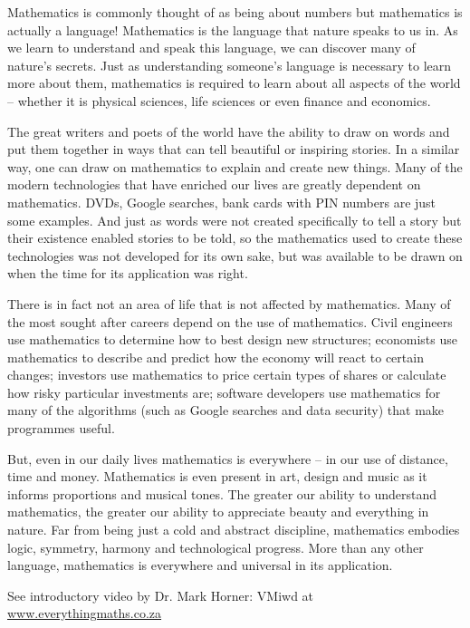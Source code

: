{ \Large
Mathematics is commonly thought of as being about numbers but mathematics is actually a language! Mathematics is the language that nature speaks to us in. As we learn to understand and speak this language, we can discover many of nature’s secrets. Just as understanding someone’s language is necessary to learn more about them, mathematics is required to learn about all aspects of the world -- whether it is physical sciences, life sciences or even finance and economics.\par


The great writers and poets of the world have the ability to draw on words and put them together in
ways that can tell beautiful or inspiring stories. In a similar way, one can draw on mathematics to
explain and create new things. Many of the modern technologies that have enriched our lives are
greatly dependent on mathematics. DVDs, Google searches, bank cards with PIN numbers are just
some examples. And just as words were not created specifically to tell a story but their existence enabled
stories to be told, so the mathematics used to create these technologies was not developed for its own sake,
but was available to be drawn on when the time for its application was right.\par


There is in fact not an area of life that is not affected by mathematics. Many of the most sought after
careers depend on the use of mathematics. Civil engineers use mathematics to determine how to best
design new structures; economists use mathematics to describe and predict how the economy will react
to certain changes; investors use mathematics to price certain types of shares or calculate how risky
particular investments are; software developers use mathematics for many of the algorithms (such as
Google searches and data security) that make programmes useful.\par



But, even in our daily lives mathematics is everywhere – in our use of distance, time and money.
Mathematics is even present in art, design and music as it informs proportions and musical tones. The
greater our ability to understand mathematics, the greater our ability to appreciate beauty and
everything in nature. Far from being just a cold and abstract discipline, mathematics
embodies logic, symmetry, harmony and technological progress. More than any other language,
mathematics is everywhere and universal in its application.\par


See introductory video by Dr. Mark Horner:  VMiwd at \underline{www.everythingmaths.co.za}



}





